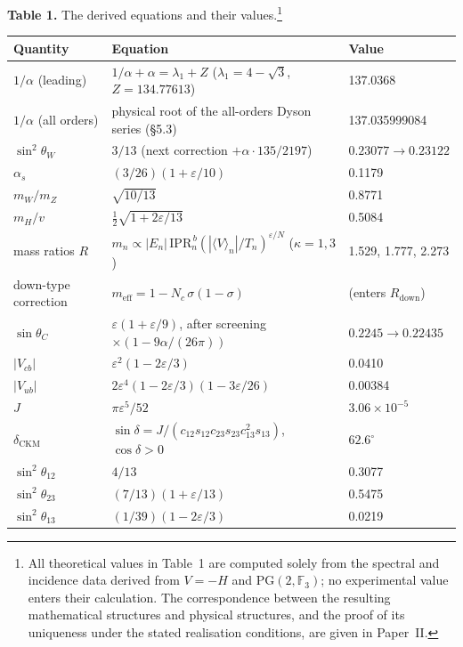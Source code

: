\documentclass[12pt,a4paper]{article}
\begin{document}
\bigskip\noindent\textbf{Table 1.} The derived equations and their values.\footnote{All theoretical values in Table~1 are computed solely from the spectral and incidence data derived from $V=-H$ and $\mathrm{PG}(2,\mathbb F_3)$; no experimental value enters their calculation. The correspondence between the resulting mathematical structures and physical structures, and the proof of its uniqueness under the stated realisation conditions, are given in Paper~II.}
\nopagebreak[4]
\begin{center}\footnotesize\setlength{\tabcolsep}{4pt}
\begin{tabular}{@{}lll@{}}
\toprule
Quantity & Equation & Value \\
\midrule
$1/\alpha$ (leading) & $1/\alpha + \alpha = \lambda_1 + Z$ ($\lambda_1 = 4-\sqrt3$, $Z = 134.77613$) & 137.0368 \\
$1/\alpha$ (all orders) & physical root of the all-orders Dyson series (\S5.3) & 137.035999084 \\
$\sin^2\!\theta_W$ & $3/13$ (next correction $+\alpha\cdot 135/2197$) & $0.23077 \to 0.23122$ \\
$\alpha_s$ & $(3/26)(1+\varepsilon/10)$ & 0.1179 \\
$m_W/m_Z$ & $\sqrt{10/13}$ & 0.8771 \\
$m_H/v$ & $\tfrac12\sqrt{1+2\varepsilon/13}$ & 0.5084 \\
mass ratios $R$ & $m_n \propto |E_n|\,\mathrm{IPR}_n^{\,b}(|\langle V\rangle_n|/T_n)^{\varepsilon/N}$ ($\kappa = 1, 3$) & 1.529, 1.777, 2.273 \\
down-type correction & $m_\mathrm{eff} = 1 - N_c\,\sigma(1-\sigma)$ & (enters $R_\mathrm{down}$) \\
$\sin\theta_C$ & $\varepsilon(1+\varepsilon/9)$, after screening $\times(1-9\alpha/(26\pi))$ & $0.2245 \to 0.22435$ \\
$|V_{cb}|$ & $\varepsilon^2(1-2\varepsilon/3)$ & 0.0410 \\
$|V_{ub}|$ & $2\varepsilon^4(1-2\varepsilon/3)(1-3\varepsilon/26)$ & 0.00384 \\
$J$ & $\pi\varepsilon^5/52$ & $3.06\times10^{-5}$ \\
$\delta_\mathrm{CKM}$ & $\sin\delta = J/(c_{12}s_{12}c_{23}s_{23}c_{13}^2 s_{13})$, $\cos\delta>0$ & $62.6^\circ$ \\
$\sin^2\!\theta_{12}$ & $4/13$ & 0.3077 \\
$\sin^2\!\theta_{23}$ & $(7/13)(1+\varepsilon/13)$ & 0.5475 \\
$\sin^2\!\theta_{13}$ & $(1/39)(1-2\varepsilon/3)$ & 0.0219 \\

\end{tabular}
\end{center}
\end{document}
